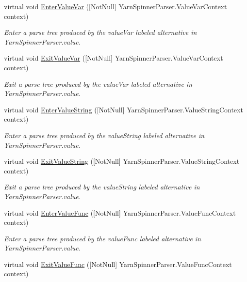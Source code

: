 \begin{DoxyCompactItemize}
virtual void \hyperlink{a00196_ab40a73dd590aa5e9081a131291fd4801}{Enter\-Value\-Var} (\mbox{[}Not\-Null\mbox{]} Yarn\-Spinner\-Parser.\-Value\-Var\-Context context)
\begin{DoxyCompactList}\small\item\em Enter a parse tree produced by the {\ttfamily value\-Var} labeled alternative in Yarn\-Spinner\-Parser.\-value. \end{DoxyCompactList}\item 
virtual void \hyperlink{a00196_ad03e275623c6693c7de931d3f3323f6c}{Exit\-Value\-Var} (\mbox{[}Not\-Null\mbox{]} Yarn\-Spinner\-Parser.\-Value\-Var\-Context context)
\begin{DoxyCompactList}\small\item\em Exit a parse tree produced by the {\ttfamily value\-Var} labeled alternative in Yarn\-Spinner\-Parser.\-value. \end{DoxyCompactList}\item 
virtual void \hyperlink{a00196_a86517c7ed031c5b2608ff7acf8b36ab1}{Enter\-Value\-String} (\mbox{[}Not\-Null\mbox{]} Yarn\-Spinner\-Parser.\-Value\-String\-Context context)
\begin{DoxyCompactList}\small\item\em Enter a parse tree produced by the {\ttfamily value\-String} labeled alternative in Yarn\-Spinner\-Parser.\-value. \end{DoxyCompactList}\item 
virtual void \hyperlink{a00196_a0edac722aaa4daaf67b6952f9f323849}{Exit\-Value\-String} (\mbox{[}Not\-Null\mbox{]} Yarn\-Spinner\-Parser.\-Value\-String\-Context context)
\begin{DoxyCompactList}\small\item\em Exit a parse tree produced by the {\ttfamily value\-String} labeled alternative in Yarn\-Spinner\-Parser.\-value. \end{DoxyCompactList}\item 
virtual void \hyperlink{a00196_af8f0ba926e47307649e74f867ac60a46}{Enter\-Value\-Func} (\mbox{[}Not\-Null\mbox{]} Yarn\-Spinner\-Parser.\-Value\-Func\-Context context)
\begin{DoxyCompactList}\small\item\em Enter a parse tree produced by the {\ttfamily value\-Func} labeled alternative in Yarn\-Spinner\-Parser.\-value. \end{DoxyCompactList}\item 
virtual void \hyperlink{a00196_ac9b0090b8a75d8aa28bcca61fedb5906}{Exit\-Value\-Func} (\mbox{[}Not\-Null\mbox{]} Yarn\-Spinner\-Parser.\-Value\-Func\-Context context)

\end{DoxyCompactItemize}

